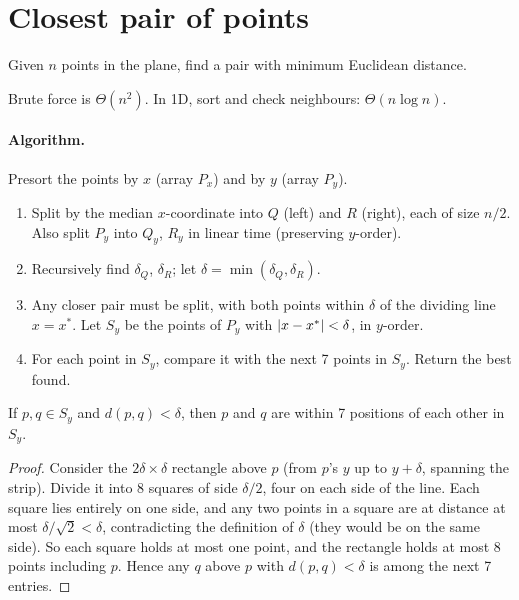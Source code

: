 \section{Closest pair of points}
\begin{definition}
Given $n$ points in the plane, find a pair with minimum Euclidean distance.
\end{definition}
Brute force is $\Theta(n^2)$. In 1D, sort and check neighbours: $\Theta(n\log n)$.

\paragraph{Algorithm.} Presort the points by $x$ (array $P_x$) and by $y$ (array $P_y$).
\begin{enumerate}
  \item Split by the median $x$-coordinate into $Q$ (left) and $R$ (right), each of size $n/2$.
        Also split $P_y$ into $Q_y$, $R_y$ in linear time (preserving $y$-order).
  \item Recursively find $\delta_Q$, $\delta_R$; let $\delta=\min(\delta_Q,\delta_R)$.
  \item Any closer pair must be split, with both points within $\delta$ of the dividing line $x=x^*$.
        Let $S_y$ be the points of $P_y$ with $\left\lvert x-x^* \right\rvert<\delta$, in $y$-order.
  \item For each point in $S_y$, compare it with the next 7 points in $S_y$. Return the best found.
\end{enumerate}

\begin{lemma}
If $p,q\in S_y$ and $d(p,q)<\delta$, then $p$ and $q$ are within 7 positions of each other in $S_y$.
\end{lemma}
\begin{proof}
Consider the $2\delta\times\delta$ rectangle above $p$ (from $p$'s $y$ up to $y+\delta$, spanning the strip).
Divide it into 8 squares of side $\delta/2$, four on each side of the line. Each square lies entirely on one side,
and any two points in a square are at distance at most $\delta/\sqrt2<\delta$, contradicting the definition of
$\delta$ (they would be on the same side). So each square holds at most one point, and the rectangle holds at most 8
points including $p$. Hence any $q$ above $p$ with $d(p,q)<\delta$ is among the next 7 entries.
\end{proof}

